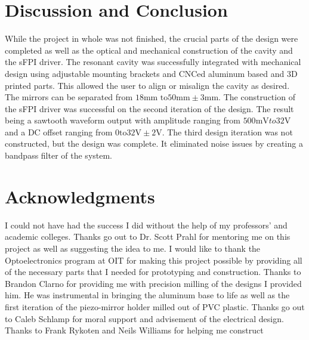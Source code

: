 \documentclass[12pt,journal]{IEEEtran}
\begin{document}

\section{Discussion and Conclusion}

 While the project in whole was not finished, the crucial parts of the design were completed as well as the optical and mechanical construction of the cavity and the sFPI driver. The resonant cavity was successfully integrated with mechanical design using adjustable mounting brackets and CNCed aluminum based and 3D printed parts. This allowed the user to align or misalign the cavity as desired. The mirrors can be separated from $18 \text{mm to} 50 \text{mm} \pm 3 \text{mm}$. The construction of the sFPI driver was successful on the second iteration of the design. The result being a sawtooth waveform output with amplitude ranging from $500 \text{mV} to 32 \text{V}$ and a DC offset ranging from $0 \text{to} 32 \text{V} \pm 2 \text{V}$. The third design iteration was not constructed, but the design was complete. It eliminated noise issues by creating a bandpass filter of the system.   


\section{Acknowledgments}

I could not have had the success I did without the help of my professors' and academic colleges. Thanks go out to Dr. Scott Prahl for mentoring me on this project as well as suggesting the idea to me. I would like to thank the Optoelectronics program at OIT for making this project possible by providing all of the necessary parts that I needed for prototyping and construction. Thanks to Brandon Clarno for providing me with precision milling of the designs I provided him. He was instrumental in bringing the aluminum base to life as well as the first iteration of the piezo-mirror holder milled out of PVC plastic. Thanks go out to Caleb Schlamp for moral support and advisement of the electrical design. Thanks to Frank Rykoten and Neils Williams for helping me construct 
\end{document}
